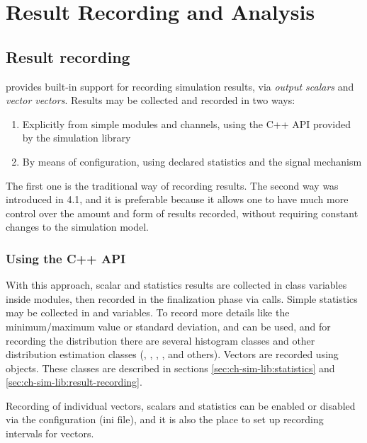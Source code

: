 \chapter{Result Recording and Analysis}
\label{cha:analyzing-simulation-results}


\section{Result recording}

{\opp} provides built-in support for recording simulation results, via
\textit{output scalars} and \textit{vector vectors}. Results may be
collected and recorded in two ways:

\begin{enumerate}
  \item Explicitly from simple modules and channels, using the C++ API
    provided by the simulation library
  \item By means of configuration, using declared statistics and the
    signal mechanism
\end{enumerate}

The first one is the traditional way of recording results. The second way
was introduced in {\opp} 4.1, and it is preferable because it allows one
to have much more control over the amount and form of results recorded,
without requiring constant changes to the simulation model.

\subsection{Using the C++ API}

With this approach, scalar and statistics results are collected in class
variables inside modules, then recorded in the finalization phase via
 calls. Simple statistics may be collected in
 and  variables. To record more details like the
minimum/maximum value or standard deviation,  and
 can be used, and for recording the distribution
there are several histogram classes and other distribution estimation
classes (, ,
, , and others). Vectors are recorded
using  objects. These classes are described in sections
\ref{sec:ch-sim-lib:statistics} and \ref{sec:ch-sim-lib:result-recording}.

Recording of individual vectors, scalars and statistics can be enabled or
disabled via the configuration (ini file), and it is also the place to set
up recording intervals for vectors.

